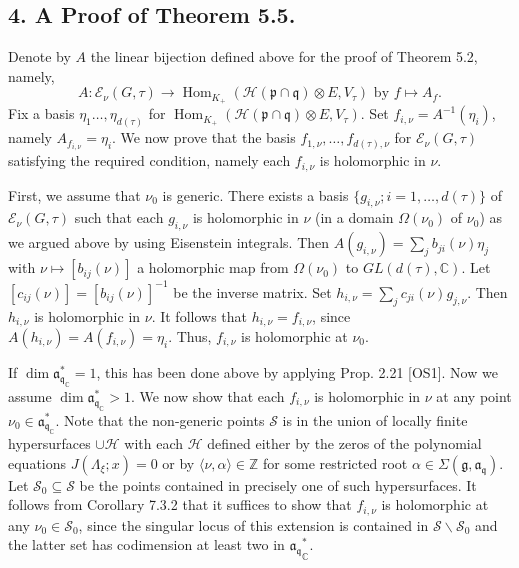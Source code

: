 \documentclass[a4paper]{amsart}
\theoremstyle{plain}
\theoremstyle{definition}
\def\Hom{\operatorname{Hom}}
\newcommand{\field}{\mathbb}
\newcommand{\Z}{{\field Z}}
\newcommand{\fra}{\mathfrak{a}}
\newcommand{\frg}{\mathfrak{g}}
\newcommand{\frp}{\mathfrak{p}}
\newcommand{\frq}{\mathfrak{q}}
\newcommand{\bbC}{\mathbb{C}}
\newcommand{\caE}{\mathcal{E}}
\newcommand{\caH}{\mathcal{H}}
\newcommand{\caS}{\mathcal{S}}
\begin{document}
\subsection*{4. A Proof of Theorem 5.5.}
Denote by $A$  the linear bijection defined above for the proof of Theorem 5.2, namely,
$$A\colon \caE_\nu(G,\tau)\rightarrow \Hom_{K_+}(\caH(\frp\cap\frq)\otimes E, V_\tau) \text{ by }  f\mapsto A_f. $$
Fix a basis $\eta_1\ldots,\eta_{d(\tau)}$ for $\Hom_{K_+}(\caH(\frp\cap\frq)\otimes E, V_\tau)$.
 Set $f_{i,\nu}=A^{-1}(\eta_i)$, namely $A_{f_{i,\nu}}=\eta_i$. We now prove that the basis $f_{1,\nu},\ldots,f_{d(\tau),\nu}$  for $\caE_\nu(G,\tau)$ satisfying the required condition, namely each $f_{i,\nu}$ is holomorphic in $\nu$.

First, we assume that $\nu_0$ is generic. There exists a basis $\{g_{i,\nu};i=1,\ldots ,d(\tau)\}$ of $\caE_\nu(G,\tau)$ such that each
$g_{i,\nu}$ is holomorphic in $\nu$ (in a domain $\Omega(\nu_0)$ of  $\nu_0$) as we argued above by using Eisenstein integrals.
Then $A({g_{i,\nu}})=\sum_jb_{ji}(\nu)\eta_j$ with $\nu\mapsto [b_{ij}(\nu)]$ a holomorphic map from $\Omega(\nu_0)$ to $GL(d(\tau),\bbC)$.
Let $[c_{ij}(\nu)]=[b_{ij}(\nu)]^{-1}$ be the inverse matrix.  Set $h_{i,\nu}=\sum_{j}c_{ji}(\nu)g_{j,\nu}$.
Then $h_{i,\nu}$ is holomorphic in $\nu$.  It follows that $h_{i,\nu}=f_{i,\nu}$,  since
 $A({h_{i,\nu}})=A({f_{i,\nu}})=\eta_i$.  Thus, $f_{i,\nu}$ is holomorphic at $\nu_0$.


If $\dim\fra^*_{\frq_\bbC}=1$, this has been done above by applying Prop. 2.21 [OS1].
Now we assume $\dim\fra^*_{\frq_\bbC}>1$.  We now show that
each $f_{i,\nu}$ is holomorphic in $\nu$ at any point $\nu_0\in \fra^*_{\frq_\bbC}$.
Note that the non-generic points $\caS$ is in the union of locally finite 
hypersurfaces $\cup \caH$ with each $\caH$ defined either by the zeros of the polynomial equations $J(\Lambda_\xi;x)=0$
or by  $\langle \nu,\alpha \rangle\in \Z$ for some restricted root $\alpha\in \Sigma(\frg,\fra_\frq)$.
Let $\caS_0\subseteq \caS$ be the points contained in precisely one of such hypersurfaces.
It follows from Corollary 7.3.2 \cite{K} that it suffices to show that
$f_{i,\nu}$ is holomorphic at any $\nu_0\in \caS_0$, since the singular locus of this extension is contained in $\caS\backslash\caS_0$ and the latter set has codimension
at least two in ${\fra_\frq}^*_\bbC$.
\end{document}
